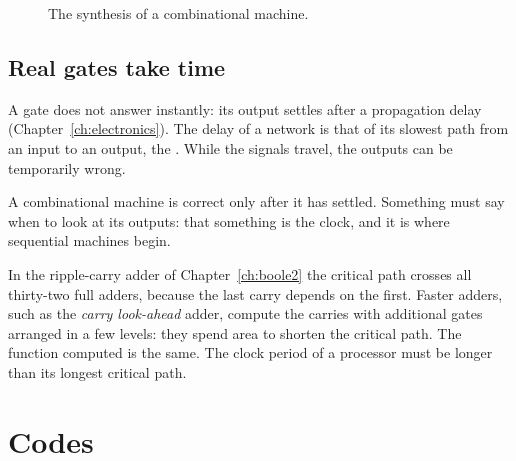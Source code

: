 \begin{figure}[htb]
\centering
{}
\caption{The synthesis of a combinational machine.}
\label{fig:cm:design}
\end{figure}

\subsection{Real gates take time}

A gate does not answer instantly: its output settles after a propagation
delay (Chapter~\ref{ch:electronics}). The delay of a network is that of its
slowest path from an input to an output, the . While the
signals travel, the outputs can be temporarily wrong.

\begin{prgconcept}
A combinational machine is correct only after it has settled. Something must
say when to look at its outputs: that something is the clock, and it is where
sequential machines begin.
\end{prgconcept}

In the ripple-carry adder of Chapter~\ref{ch:boole2} the critical path
crosses all thirty-two full adders, because the last carry depends on the
first. Faster adders, such as the \emph{carry look-ahead} adder, compute the
carries with additional gates arranged in a few levels: they spend area to
shorten the critical path. The function computed is the same. The clock
period of a processor must be longer than its longest critical path.

\section{Codes}

